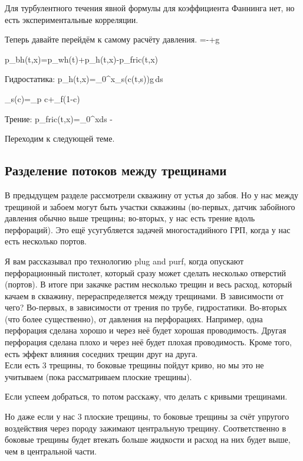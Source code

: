 \documentclass[main.tex]{subfiles}
\begin{document}
Для турбулентного течения явной формулы для коэффициента Фаннинга нет, но есть экспериментальные корреляции.

Теперь давайте перейдём к самому расчёту давления.
\beq
{}=-+\overline{\rho}g\sin{\theta}
\eeq

\beq
p_{bh}(t,x)=p_{wh}(t)+\Delta p_h(t,x)-\Delta p_{fric}(t,x)
\eeq

Гидростатика:
\beq
\Delta p_h(t,x)=\int\limits_{0}^{x}\rho_s(c(t,s))g\,ds
\eeq

\beq
\rho_s(c)=\rho_p c+\rho_f\left(1-c\right)
\eeq

Трение:
\beq
\Delta p_{fric}(t,x)=\int\limits_0^xds - 
\eeq

Переходим к следующей теме.

\subsection{Разделение потоков между трещинами}

В предыдущем разделе рассмотрели скважину от устья до забоя.
Но у нас между трещиной и забоем могут быть участки скважины (во-первых, датчик забойного давления обычно выше трещины; во-вторых, у нас есть трение вдоль перфораций).
Это ещё усугубляется задачей многостадийного ГРП, когда у нас есть несколько портов.

Я вам рассказывал про технологию plug and purf, когда опускают перфорационный пистолет, который сразу может сделать несколько отверстий (портов).
В итоге при закачке растим несколько трещин и весь расход, который качаем в скважину, перераспределяется между трещинами.
В зависимости от чего?
Во-первых, в зависимости от трения по трубе, гидростатики.
Во-вторых (что более существенно), от давления на перфорациях.
Например, одна перфорация сделана хорошо и через неё будет хорошая проводимость.
Другая перфорация сделана плохо и через неё будет плохая проводимость.
Кроме того, есть эффект влияния соседних трещин друг на друга.
\\

Если есть 3 трещины, то боковые трещины пойдут криво, но мы это не учитываем (пока рассматриваем плоские трещины).

Если успеем добраться, то потом расскажу, что делать с кривыми трещинами.

Но даже если у нас 3 плоские трещины, то боковые трещины за счёт упругого воздействия через породу зажимают центральную трещину.
Соответственно в боковые трещины будет втекать больше жидкости и расход на них будет выше, чем в центральной части.
\end{document}
